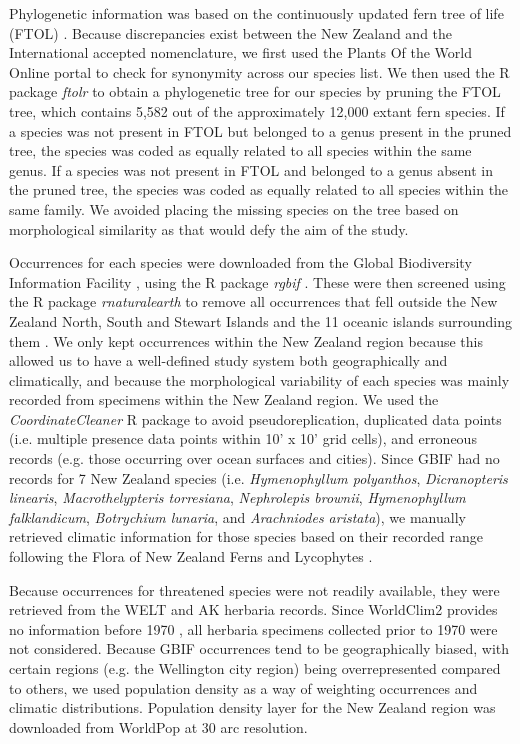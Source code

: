 \documentclass[preprint,12pt,authoryear]{elsarticle}
\begin{document}
Phylogenetic information was based on the continuously updated fern tree of life (FTOL) \citep{nitta2022open}. Because discrepancies exist between the New Zealand and the International accepted nomenclature, we first used the Plants Of the World Online portal \citep{powo} to check for synonymity across our species list. We then used the R package \textit{ftolr} \citep{nitta2022open} to obtain a phylogenetic tree for our species by pruning the FTOL tree, which contains 5,582 out of the approximately 12,000 extant fern species. If a species was not present in FTOL but belonged to a genus present in the pruned tree, the species was coded as equally related to all species within the same genus. If a species was not present in FTOL and belonged to a genus absent in the pruned tree, the species was coded as equally related to all species within the same family. We avoided placing the missing species on the tree based on morphological similarity as that would defy the aim of the study.

Occurrences for each species were downloaded from the Global Biodiversity Information Facility \citep{gbif}, using the R package \textit{rgbif} \citep{chamberlain2017package}. These were then screened using the R package \textit{rnaturalearth} \citep{south2017r} to remove all occurrences that fell outside the New Zealand North, South and Stewart Islands and the 11 oceanic islands surrounding them \citep{ciarle2023island}. We only kept occurrences within the New Zealand region because this allowed us to have a well-defined study system both geographically and climatically, and because the morphological variability of each species was mainly recorded from specimens within the New Zealand region. We used the \textit{CoordinateCleaner} R package \citep{zizka2019coordinatecleaner} to avoid pseudoreplication, duplicated data points (i.e. multiple presence data points within 10' x 10' grid cells), and erroneous records (e.g. those occurring over ocean surfaces and cities). Since GBIF had no records for 7 New Zealand species (i.e. \textit{Hymenophyllum polyanthos}, \textit{Dicranopteris linearis}, \textit{Macrothelypteris torresiana}, \textit{Nephrolepis brownii}, \textit{Hymenophyllum falklandicum}, \textit{Botrychium lunaria}, and \textit{Arachniodes aristata}), we manually retrieved climatic information for those species based on their recorded range following the Flora of New Zealand Ferns and Lycophytes \citep{brownsey2014flora}. 

Because occurrences for threatened species were not readily available, they were retrieved from the WELT and AK herbaria records. Since WorldClim2 provides no information before 1970 \citep{fick2017worldclim}, all herbaria specimens collected prior to 1970 were not considered. Because GBIF occurrences tend to be geographically biased, with certain regions (e.g. the Wellington city region) being overrepresented compared to others, we used population density as a way of weighting occurrences and climatic distributions. Population density layer for the New Zealand region was downloaded from WorldPop \citep{tatem2017worldpop} at 30 arc resolution. 
\end{document}
